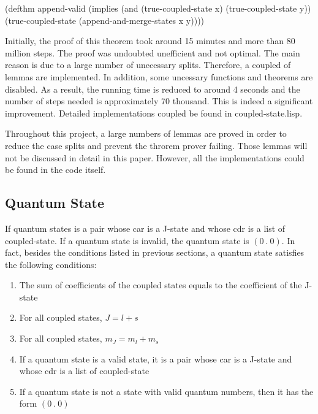 \documentclass[12pt,journal,compsoc]{IEEEtran}
\begin{document}
\begin{acl2-lst}
(defthm append-valid
 (implies (and (true-coupled-state x)
	   (true-coupled-state y))
  (true-coupled-state 
	(append-and-merge-states x y))))
\end{acl2-lst}

Initially, the proof of this theorem took around 15 minutes and more than 80 million steps. The proof was undoubted unefficient and not optimal. The main reason is due to a large number of unecessary splits. Therefore, a coupled of lemmas are implemented. In addition, some uncessary functions and theorems are disabled. As a result, the running time is reduced to around 4 seconds and the number of steps needed is approximately 70 thousand. This is indeed a significant improvement. Detailed implementations coupled be found in coupled-state.lisp.

Throughout this project, a large numbers of lemmas are proved in order to reduce the case splits and prevent the throrem prover failing. Those lemmas will not be discussed in detail in this paper. However, all the implementations could be found in the code itself.

\subsection{Quantum State}

If quantum states is a pair whose car is a J-state and whose cdr is a list of coupled-state. If a quantum state is invalid, the quantum state is $(0\ .\ 0)$. In fact, besides the conditions listed in previous sections, a quantum state satisfies the following conditions:

\begin{enumerate}

\item The sum of coefficients of the coupled states equals to the coefficient of the J-state

\item For all coupled states, $J=l+s$

\item For all coupled states, $m_J=m_l+m_s$

\item If a quantum state is a valid state, it is a pair whose car is a J-state and whose cdr is a list of coupled-state

\item If a quantum state is not a state with valid quantum numbers, then it has the form $(0\ .\ 0)$

\end{enumerate}
\end{document}
